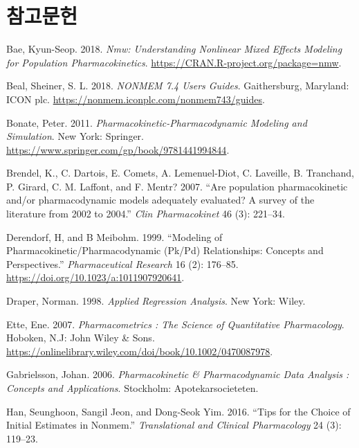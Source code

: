 \documentclass[
  10pt,
  krantz2,
  a4paper]{krantz}
\newlength{\cslhangindent}
\newenvironment{cslreferences}%
  {\setlength{\parindent}{0pt}%
  \everypar{\setlength{\hangindent}{\cslhangindent}}\ignorespaces}%
  {\par}
\theoremstyle{definition}
\theoremstyle{definition}
\theoremstyle{definition}
\theoremstyle{remark}
\begin{document}
\hypertarget{uxcc38uxace0uxbb38uxd5cc}{%
\chapter*{참고문헌}\label{uxcc38uxace0uxbb38uxd5cc}}


\hypertarget{refs}{}
\begin{cslreferences}
\leavevmode\hypertarget{ref-R-nmw}{}%
Bae, Kyun-Seop. 2018. \emph{Nmw: Understanding Nonlinear Mixed Effects Modeling for Population Pharmacokinetics}. \url{https://CRAN.R-project.org/package=nmw}.

\leavevmode\hypertarget{ref-nonmem}{}%
Beal, Sheiner, S. L. 2018. \emph{NONMEM 7.4 Users Guides}. Gaithersburg, Maryland: ICON plc. \url{https://nonmem.iconplc.com/nonmem743/guides}.

\leavevmode\hypertarget{ref-bonate}{}%
Bonate, Peter. 2011. \emph{Pharmacokinetic-Pharmacodynamic Modeling and Simulation}. New York: Springer. \url{https://www.springer.com/gp/book/9781441994844}.

\leavevmode\hypertarget{ref-pmid17328581}{}%
Brendel, K., C. Dartois, E. Comets, A. Lemenuel-Diot, C. Laveille, B. Tranchand, P. Girard, C. M. Laffont, and F. Mentr? 2007. ``Are population pharmacokinetic and/or pharmacodynamic models adequately evaluated? A survey of the literature from 2002 to 2004.'' \emph{Clin Pharmacokinet} 46 (3): 221--34.

\leavevmode\hypertarget{ref-derendorf1999modeling}{}%
Derendorf, H, and B Meibohm. 1999. ``Modeling of Pharmacokinetic/Pharmacodynamic (Pk/Pd) Relationships: Concepts and Perspectives.'' \emph{Pharmaceutical Research} 16 (2): 176--85. \url{https://doi.org/10.1023/a:1011907920641}.

\leavevmode\hypertarget{ref-draper1998applied}{}%
Draper, Norman. 1998. \emph{Applied Regression Analysis}. New York: Wiley.

\leavevmode\hypertarget{ref-ette}{}%
Ette, Ene. 2007. \emph{Pharmacometrics : The Science of Quantitative Pharmacology}. Hoboken, N.J: John Wiley \& Sons. \url{https://onlinelibrary.wiley.com/doi/book/10.1002/0470087978}.

\leavevmode\hypertarget{ref-gabrielsson}{}%
Gabrielsson, Johan. 2006. \emph{Pharmacokinetic \& Pharmacodynamic Data Analysis : Concepts and Applications}. Stockholm: Apotekarsocieteten.

\leavevmode\hypertarget{ref-han2016tips}{}%
Han, Seunghoon, Sangil Jeon, and Dong-Seok Yim. 2016. ``Tips for the Choice of Initial Estimates in Nonmem.'' \emph{Translational and Clinical Pharmacology} 24 (3): 119--23.


\end{cslreferences}
\end{document}
